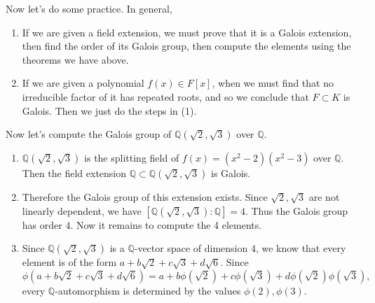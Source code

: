   Now let's do some practice. In general, 
  \begin{enumerate}
    \item If we are given a field extension, we must prove that it is a Galois extension, then find the order of its Galois group, then compute the elements using the theorems we have above. 
    \item If we are given a polynomial $f(x) \in F[x]$, when we must find that no irreducible factor of it has repeated roots, and so we conclude that $F \subset K$ is Galois. Then we just do the steps in (1). 
  \end{enumerate}

  \begin{example}
    Now let's compute the Galois group of $\mathbb{Q}(\sqrt{2}, \sqrt{3})$ over $\mathbb{Q}$. 
    \begin{enumerate}
      \item $\mathbb{Q}(\sqrt{2}, \sqrt{3})$ is the splitting field of $f(x) = (x^2 - 2)(x^2 - 3)$ over $\mathbb{Q}$. Then the field extension $\mathbb{Q} \subset \mathbb{Q}(\sqrt{2}, \sqrt{3})$ is Galois. 

      \item Therefore the Galois group of this extension exists. Since $\sqrt{2}, \sqrt{3}$ are not linearly dependent, we have $[\mathbb{Q}(\sqrt{2}, \sqrt{3}):\mathbb{Q}] = 4$. Thus the Galois group has order $4$. Now it remains to compute the 4 elements. 

      \item Since $\mathbb{Q}(\sqrt{2}, \sqrt{3})$ is a $\mathbb{Q}$-vector space of dimension 4, we know that every element is of the form $a + b \sqrt{2} + c \sqrt{3} + d \sqrt{6}$. Since 
      \begin{equation}
        \phi(a + b \sqrt{2} + c \sqrt{3} + d \sqrt{6}) = a + b \phi(\sqrt{2}) + c \phi(\sqrt{3}) + d \phi(\sqrt{2}) \phi(\sqrt{3}), 
      \end{equation}
      every $\mathbb{Q}$-automorphism is determined by the values $\phi(2), \phi(3)$. 


\end{enumerate}
\end{example}
